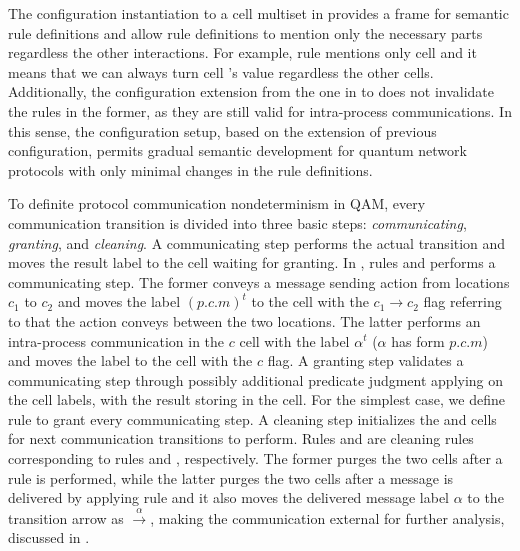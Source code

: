 The configuration instantiation to a cell multiset in  provides a frame for semantic rule definitions
and allow rule definitions to mention only the necessary parts regardless the other interactions.
For example, rule  mentions only cell  and it means that we can always turn cell 's value  regardless the other cells. Additionally, the configuration extension from the one in  to  does not invalidate the rules in the former, as they are still valid for intra-process communications.
In this sense, the configuration setup, based on the extension of previous configuration, permits gradual semantic development for quantum network protocols with only minimal changes in the rule definitions.

To definite protocol communication nondeterminism in QAM, every communication transition is divided into three basic steps: \textit{communicating}, \textit{granting}, and \textit{cleaning}. 
A communicating step performs the actual transition and moves the result label to the  cell waiting for granting.
In , rules  and  performs a communicating step.
The former conveys a message sending action from locations $c_1$ to $c_2$ and moves the label $(p.c.m)^t$ to the  cell with the $c_1\rightarrow c_2$ flag referring to that the action conveys between the two locations.
The latter performs an intra-process communication in the $c$ cell with the label $\alpha^t$ ($\alpha$ has form $p.c.m$) and moves the label to the  cell with the $c$ flag.
A granting step validates a communicating step through possibly additional predicate judgment applying on the  cell labels, with the result storing in the  cell. For the simplest case, we define rule  to grant every communicating step.
A cleaning step initializes the  and  cells for next communication transitions to perform.
Rules  and  are cleaning rules corresponding to rules  and , respectively.
The former purges the two cells after a  rule is performed,
while the latter purges the two cells after a message is delivered by applying rule  and it also moves the delivered message label $\alpha$ to the transition arrow as $\xrightarrow{\alpha}$, making the communication external for further analysis, discussed in .  

